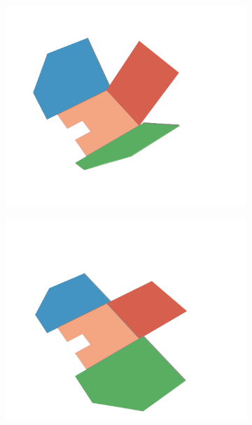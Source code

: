 \begin{figure}[h]
\begin{subfigure}[t]{\subfigureWidth}
		\includegraphics[height=\graphicsHeight]{sections/design/solar-array/images/deployment/ismenius-cavus/solar_array_deployment_ismenius_cavus_030.png}
		\label{fig:sub:deployment-sequence-ismenius-cavus-mid-bow-and-stern}
	\end{subfigure}\hfill
    \begin{subfigure}[t]{\subfigureWidth}
        \centering
		\includegraphics[height=\graphicsHeight]{sections/design/solar-array/images/deployment/ismenius-cavus/solar_array_deployment_ismenius_cavus_060.png}

\end{subfigure}
\end{figure}
